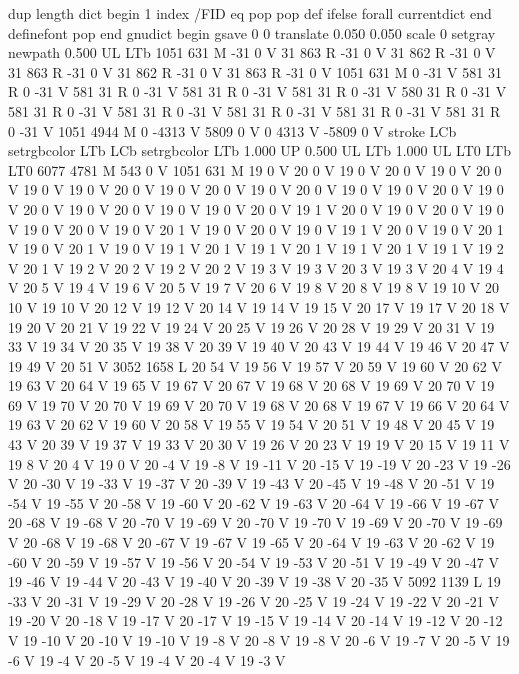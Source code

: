 {{{{{dup length dict begin {1 index /FID eq {pop pop} {def} ifelse} forall
currentdict end definefont pop
end
gnudict begin
gsave
0 0 translate
0.050 0.050 scale
0 setgray
newpath
0.500 UL
LTb
1051 631 M
-31 0 V
31 863 R
-31 0 V
31 862 R
-31 0 V
31 863 R
-31 0 V
31 862 R
-31 0 V
31 863 R
-31 0 V
1051 631 M
0 -31 V
581 31 R
0 -31 V
581 31 R
0 -31 V
581 31 R
0 -31 V
581 31 R
0 -31 V
580 31 R
0 -31 V
581 31 R
0 -31 V
581 31 R
0 -31 V
581 31 R
0 -31 V
581 31 R
0 -31 V
581 31 R
0 -31 V
1051 4944 M
0 -4313 V
5809 0 V
0 4313 V
-5809 0 V
stroke
LCb setrgbcolor
LTb
LCb setrgbcolor
LTb
1.000 UP
0.500 UL
LTb
1.000 UL
LT0
LTb
LT0
6077 4781 M
543 0 V
1051 631 M
19 0 V
20 0 V
19 0 V
20 0 V
19 0 V
20 0 V
19 0 V
19 0 V
20 0 V
19 0 V
20 0 V
19 0 V
20 0 V
19 0 V
19 0 V
20 0 V
19 0 V
20 0 V
19 0 V
20 0 V
19 0 V
19 0 V
20 0 V
19 1 V
20 0 V
19 0 V
20 0 V
19 0 V
19 0 V
20 0 V
19 0 V
20 1 V
19 0 V
20 0 V
19 0 V
19 1 V
20 0 V
19 0 V
20 1 V
19 0 V
20 1 V
19 0 V
19 1 V
20 1 V
19 1 V
20 1 V
19 1 V
20 1 V
19 1 V
19 2 V
20 1 V
19 2 V
20 2 V
19 2 V
20 2 V
19 3 V
19 3 V
20 3 V
19 3 V
20 4 V
19 4 V
20 5 V
19 4 V
19 6 V
20 5 V
19 7 V
20 6 V
19 8 V
20 8 V
19 8 V
19 10 V
20 10 V
19 10 V
20 12 V
19 12 V
20 14 V
19 14 V
19 15 V
20 17 V
19 17 V
20 18 V
19 20 V
20 21 V
19 22 V
19 24 V
20 25 V
19 26 V
20 28 V
19 29 V
20 31 V
19 33 V
19 34 V
20 35 V
19 38 V
20 39 V
19 40 V
20 43 V
19 44 V
19 46 V
20 47 V
19 49 V
20 51 V
3052 1658 L
20 54 V
19 56 V
19 57 V
20 59 V
19 60 V
20 62 V
19 63 V
20 64 V
19 65 V
19 67 V
20 67 V
19 68 V
20 68 V
19 69 V
20 70 V
19 69 V
19 70 V
20 70 V
19 69 V
20 70 V
19 68 V
20 68 V
19 67 V
19 66 V
20 64 V
19 63 V
20 62 V
19 60 V
20 58 V
19 55 V
19 54 V
20 51 V
19 48 V
20 45 V
19 43 V
20 39 V
19 37 V
19 33 V
20 30 V
19 26 V
20 23 V
19 19 V
20 15 V
19 11 V
19 8 V
20 4 V
19 0 V
20 -4 V
19 -8 V
19 -11 V
20 -15 V
19 -19 V
20 -23 V
19 -26 V
20 -30 V
19 -33 V
19 -37 V
20 -39 V
19 -43 V
20 -45 V
19 -48 V
20 -51 V
19 -54 V
19 -55 V
20 -58 V
19 -60 V
20 -62 V
19 -63 V
20 -64 V
19 -66 V
19 -67 V
20 -68 V
19 -68 V
20 -70 V
19 -69 V
20 -70 V
19 -70 V
19 -69 V
20 -70 V
19 -69 V
20 -68 V
19 -68 V
20 -67 V
19 -67 V
19 -65 V
20 -64 V
19 -63 V
20 -62 V
19 -60 V
20 -59 V
19 -57 V
19 -56 V
20 -54 V
19 -53 V
20 -51 V
19 -49 V
20 -47 V
19 -46 V
19 -44 V
20 -43 V
19 -40 V
20 -39 V
19 -38 V
20 -35 V
5092 1139 L
19 -33 V
20 -31 V
19 -29 V
20 -28 V
19 -26 V
20 -25 V
19 -24 V
19 -22 V
20 -21 V
19 -20 V
20 -18 V
19 -17 V
20 -17 V
19 -15 V
19 -14 V
20 -14 V
19 -12 V
20 -12 V
19 -10 V
20 -10 V
19 -10 V
19 -8 V
20 -8 V
19 -8 V
20 -6 V
19 -7 V
20 -5 V
19 -6 V
19 -4 V
20 -5 V
19 -4 V
20 -4 V
19 -3 V
}}}}}
